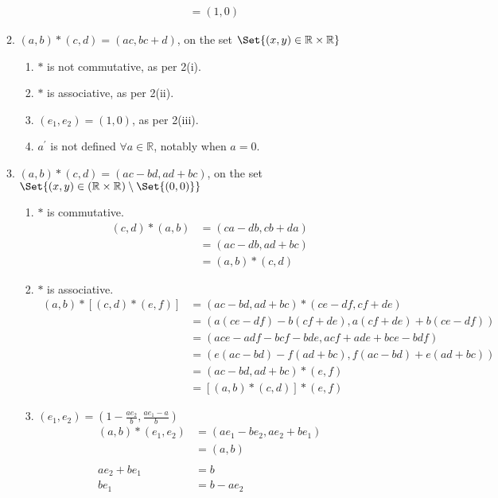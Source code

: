 \begin{enumerate}[label={\Alph*.},font={\bfseries}]
\begin{enumerate}[label={\arabic*},font={\bfseries}]
\begin{enumerate}[label={(\roman*)}]
\begin{align*}
        &= (1,0)
      \end{align*}
    \end{enumerate}
  \item $(a, b) * (c, d) = (ac, bc + d)$, on the set $\Set{(x,y)\in\mathbb{R}\times\mathbb{R}}$
    \begin{enumerate}[label={(\roman*)}]
    \item $*$ is not commutative, as per 2(i).
    \item $*$ is associative, as per 2(ii).
    \item $(e_1,e_2) = (1,0)$, as per 2(iii).
    \item $a^\prime$ is not defined $\forall a\in\mathbb{R}$, notably when $a=0$.
    \end{enumerate}
  \item $(a, b) * (c, d) = (ac-bd,ad+bc)$, on the set $\Set{(x,y)\in(\mathbb{R}\times\mathbb{R})\setminus\Set{(0,0)}}$
    \begin{enumerate}[label={(\roman*)}]
    \item $*$ is commutative.
      \begin{align*}
        (c,d) * (a,b) &= (ca-db,cb+da) \\
        &= (ac-db,ad+bc) \\
        &= (a,b) * (c,d)
      \end{align*}
    \item $*$ is associative.
      \begin{align*}
        (a,b) * \left[(c,d) * (e,f)\right] &= (ac-bd,ad+bc) * (ce-df,cf+de) \\
        &= \left(a(ce-df) - b(cf+de), a(cf+de)+b(ce-df)\right) \\
        &= (ace-adf-bcf-bde, acf+ade+bce-bdf) \\
        &= \left(e(ac-bd)-f(ad+bc), f(ac-bd)+e(ad+bc)\right) \\
        &= (ac-bd,ad+bc) * (e,f) \\
        &= \left[(a,b) * (c,d)\right] * (e,f)
      \end{align*}
    \item $(e_1,e_2) = (1 - \frac{ae_2}{b},\frac{ae_1-a}{b})$
      \begin{align*}
        (a,b) * (e_1,e_2) &= (ae_1-be_2,ae_2+be_1) \\
        &= (a,b) \\
        \\
        ae_2+be_1 &= b \\
        be_1 &= b - ae_2 \\

\end{align*}
\end{enumerate}
\end{enumerate}
\end{enumerate}
